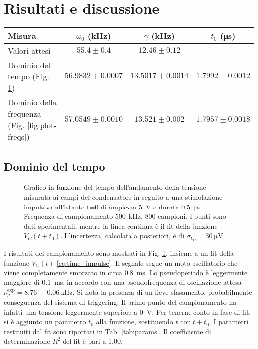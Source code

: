 \documentclass[12pt,a4paper, twocolumn]{article}
\begin{document}
\section{Risultati e discussione}
\begin{table*}
\caption{Valori attesi dei parametri $\omega_0$ e $\gamma$ e risultati dei fit nel dominio del tempo della frequenza. Le incertezze dei parametri attesi derivano da incertezze strumentali, mentre quelle derivanti dai fit sono errori standard.}
\label{tab:params}
\centering
\begin{tabular}{lccc}
\toprule
Misura & $\omega_0$ (\si{\kilo\hertz}) & $\gamma$ (\si{\kilo\hertz}) & $t_0$ (\si{\micro\second})\\
\midrule
Valori attesi & $55.4 \pm 0.4 $ & $12.46 \pm 0.12$ & \\
Dominio del tempo (Fig. \ref{fig:plot-time}) & $56.9832 \pm 0.0007$ &  $13.5017 \pm 0.0014$ & $1.7992 \pm 0.0012$ \\
Dominio della frequenza (Fig. \ref{fig:plot-freqs}) & $57.0549 \pm 0.0010$ &  $13.521 \pm 0.002$ & $1.7957 \pm 0.0018$\\
\bottomrule
\end{tabular}
\end{table*}

\subsection{Dominio del tempo}
\begin{figure}[t]
\centering

\caption{Grafico in funzione del tempo dell'andamento della tensione misurata ai campi del condensatore in seguito a una stimolazione impulsiva all'istante t=0 di ampiezza \SI{5}{\volt} e durata \SI{0.5}{\micro\second}. Frequenza di campionamento \SI{500}{\kilo\hertz}, 800 campioni. I punti sono dati sperimentali, mentre la linea continua è il fit della funzione $V_C(t+t_0)$. L'incertezza, calcolata a posteriori, è di $\sigma_{V_C} = \SI{30}{\micro\volt}$.}
\label{fig:plot-time}
\end{figure}

I risultati del campionamento sono mostrati in Fig. \ref{fig:plot-time}, insieme a un fit della funzione $V_C(t)$ \eqref{eq:time_impulse}. Il segnale segue un moto oscillatorio che viene completamente smorzato in circa \SI{0.8}{\milli\second}. Lo pseudoperiodo è leggermente maggiore di \SI{0.1}{\milli\second}, in accordo con una pseudofrequenza di oscillazione attesa $\nu_p^\text{exp} = \SI{8.76(6)}{\kilo\hertz}$. Si nota la presenza di un lieve sfasamento, probabilmente conseguenza del sistema di triggering. Il primo punto del campionamento ha infatti una tensione leggermente superiore a \SI{0}{\volt}. Per tenerne conto in fase di fit, si è aggiunto un parametro $t_0$ alla funzione, sostituendo $t$ con $t+t_0$. I parametri restituiti dal fit sono riportati in Tab. \ref{tab:params}. Il coefficiente di determinazione $R^2$ del fit è pari a 1.00.
\end{document}
